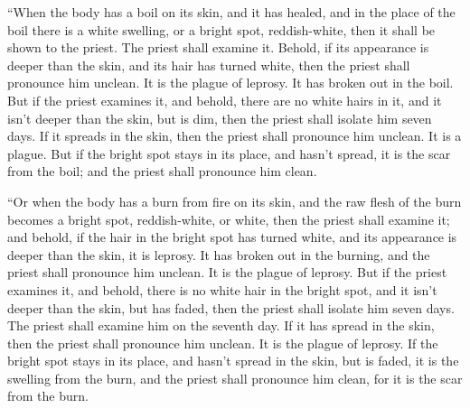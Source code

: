  ``When the body has a boil on its skin, and it has
healed,  and in the place of the boil there is a white
swelling, or a bright spot, reddish-white, then it shall be shown to the
priest.  The priest shall examine it. Behold, if its
appearance is deeper than the skin, and its hair has turned white, then
the priest shall pronounce him unclean. It is the plague of leprosy. It
has broken out in the boil.  But if the priest examines
it, and behold, there are no white hairs in it, and it isn't deeper than
the skin, but is dim, then the priest shall isolate him seven days.
 If it spreads in the skin, then the priest shall
pronounce him unclean. It is a plague.  But if the bright
spot stays in its place, and hasn't spread, it is the scar from the
boil; and the priest shall pronounce him clean.

 ``Or when the body has a burn from fire on its skin, and
the raw flesh of the burn becomes a bright spot, reddish-white, or
white,  then the priest shall examine it; and behold, if
the hair in the bright spot has turned white, and its appearance is
deeper than the skin, it is leprosy. It has broken out in the burning,
and the priest shall pronounce him unclean. It is the plague of leprosy.
 But if the priest examines it, and behold, there is no
white hair in the bright spot, and it isn't deeper than the skin, but
has faded, then the priest shall isolate him seven days. 
The priest shall examine him on the seventh day. If it has spread in the
skin, then the priest shall pronounce him unclean. It is the plague of
leprosy.  If the bright spot stays in its place, and
hasn't spread in the skin, but is faded, it is the swelling from the
burn, and the priest shall pronounce him clean, for it is the scar from
the burn.

